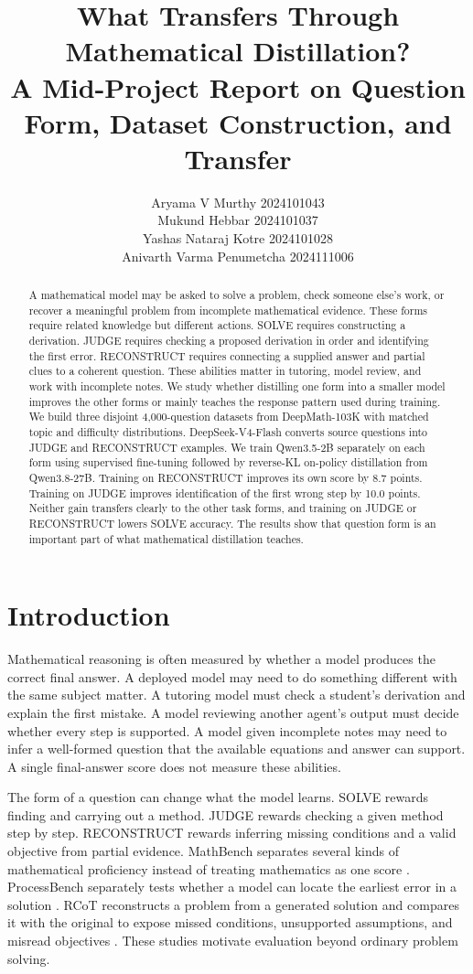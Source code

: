 \documentclass[11pt]{article}
\title{What Transfers Through Mathematical Distillation?\\
A Mid-Project Report on Question Form, Dataset Construction, and Transfer}
\author{Aryama V Murthy 2024101043 \\
  Mukund Hebbar 2024101037 \\
  Yashas Nataraj Kotre 2024101028 \\
  Anivarth Varma Penumetcha 2024111006}
\begin{document}
\maketitle

\begin{abstract}
A mathematical model may be asked to solve a problem, check someone else's work, or recover a meaningful problem from incomplete mathematical evidence. These forms require related knowledge but different actions. SOLVE requires constructing a derivation. JUDGE requires checking a proposed derivation in order and identifying the first error. RECONSTRUCT requires connecting a supplied answer and partial clues to a coherent question. These abilities matter in tutoring, model review, and work with incomplete notes. We study whether distilling one form into a smaller model improves the other forms or mainly teaches the response pattern used during training. We build three disjoint 4,000-question datasets from DeepMath-103K with matched topic and difficulty distributions. DeepSeek-V4-Flash converts source questions into JUDGE and RECONSTRUCT examples. We train Qwen3.5-2B separately on each form using supervised fine-tuning followed by reverse-KL on-policy distillation from Qwen3.8-27B. Training on RECONSTRUCT improves its own score by 8.7 points. Training on JUDGE improves identification of the first wrong step by 10.0 points. Neither gain transfers clearly to the other task forms, and training on JUDGE or RECONSTRUCT lowers SOLVE accuracy. The results show that question form is an important part of what mathematical distillation teaches.
\end{abstract}

\section{Introduction}

Mathematical reasoning is often measured by whether a model produces the correct final answer. A deployed model may need to do something different with the same subject matter. A tutoring model must check a student's derivation and explain the first mistake. A model reviewing another agent's output must decide whether every step is supported. A model given incomplete notes may need to infer a well-formed question that the available equations and answer can support. A single final-answer score does not measure these abilities.

The form of a question can change what the model learns. SOLVE rewards finding and carrying out a method. JUDGE rewards checking a given method step by step. RECONSTRUCT rewards inferring missing conditions and a valid objective from partial evidence. MathBench separates several kinds of mathematical proficiency instead of treating mathematics as one score \citep{liu2024mathbench}. ProcessBench separately tests whether a model can locate the earliest error in a solution \citep{zheng2025processbench}. RCoT reconstructs a problem from a generated solution and compares it with the original to expose missed conditions, unsupported assumptions, and misread objectives \citep{xue2023rcot}. These studies motivate evaluation beyond ordinary problem solving.
\end{document}
